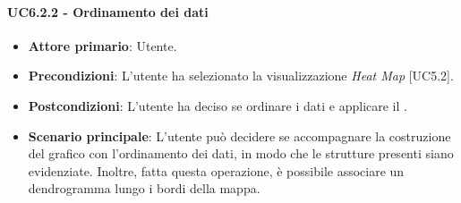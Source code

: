 \paragraph{UC6.2.2 - Ordinamento dei dati}
\begin{itemize}
	\item \textbf{Attore primario}: Utente.
	\item \textbf{Precondizioni}: L'utente ha selezionato la visualizzazione \textit{Heat Map} [UC5.2].
	\item \textbf{Postcondizioni}: L'utente ha deciso se ordinare i dati e applicare il .
	
	\item \textbf{Scenario principale}: L'utente può decidere se accompagnare la costruzione del grafico con l’ordinamento dei dati, in modo che le strutture presenti siano evidenziate. Inoltre, fatta questa operazione, è possibile associare un dendrogramma lungo i bordi della mappa.
\end{itemize}